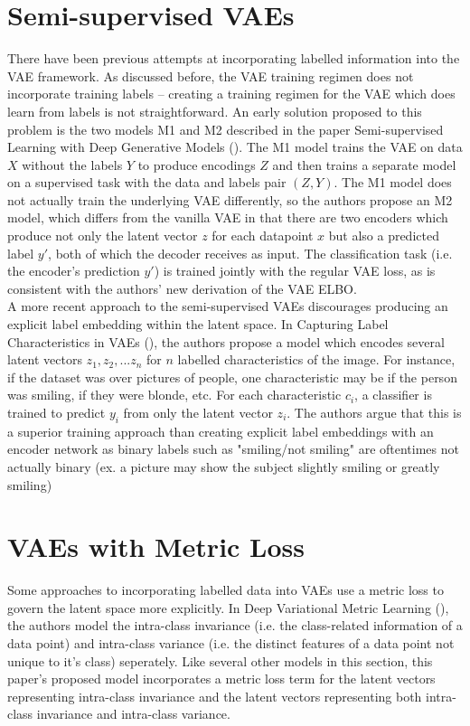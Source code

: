 \documentclass[./dissertation.tex]{subfiles}
\begin{document}
\section{Semi-supervised VAEs}
There have been previous attempts at incorporating labelled information into the VAE framework. As discussed before, the VAE training regimen does not incorporate training labels -- creating a training regimen for the VAE which does learn from labels is not straightforward. An early solution proposed to this problem is the two models M1 and M2 described in the paper Semi-supervised Learning with Deep Generative Models (\cite{kingma2014autoencoding}). The M1 model trains the VAE on data $X$ without the labels $Y$ to produce encodings $Z$ and then trains a separate model on a supervised task with the data and labels pair $(Z, Y)$. The M1 model does not actually train the underlying VAE differently, so the authors propose an M2 model, which differs from the vanilla VAE in that there are two encoders which produce not only the latent vector $z$ for each datapoint $x$ but also a predicted label $y'$, both of which the decoder receives as input. The classification task (i.e. the encoder's prediction $y'$) is trained jointly with the regular VAE loss, as is consistent with the authors' new derivation of the VAE ELBO. \\

A more recent approach to the semi-supervised VAEs discourages producing an explicit label embedding within the latent space. In Capturing Label Characteristics in VAEs (\cite{joy2020capturing}), the authors propose a model which encodes several latent vectors $z_{1}, z_{2}, ... z_{n}$ for $n$ labelled characteristics of the image. For instance, if the dataset was over pictures of people, one characteristic may be if the person was smiling, if they were blonde, etc. For each characteristic $c_{i}$, a classifier is trained to predict $y_{i}$ from only the latent vector $z_{i}$. The authors argue that this is a superior training approach than creating explicit label embeddings with an encoder network as binary labels such as "smiling/not smiling" are oftentimes not actually binary (ex. a picture may show the subject slightly smiling or greatly smiling)

\section{VAEs with Metric Loss}

Some approaches to incorporating labelled data into VAEs use a metric loss to govern the latent space more explicitly. In Deep Variational Metric Learning (\cite{lin2018deep}), the authors model the intra-class invariance (i.e. the class-related information of a data point) and intra-class variance (i.e. the distinct features of a data point not unique to it's class) seperately. Like several other models in this section, this paper's proposed model incorporates a metric loss term for the latent vectors representing intra-class invariance and the latent vectors representing both intra-class invariance and intra-class variance. \\
\end{document}
